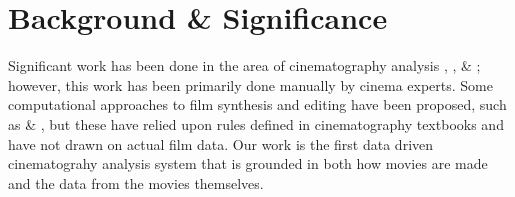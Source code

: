 
\section*{Background \& Significance}
Significant work has been done in the area of cinematography analysis \cite{bresson_notes_1997}, \cite{bordwell_film_2009}, \& \cite{arijon_grammar_1991}; however, this work has been primarily done manually by cinema experts. Some computational approaches to film synthesis and editing have been proposed, such as \cite{he_virtual_1996} \& \cite{lino_how_2014}, but these have relied upon rules defined in cinematography textbooks and have not drawn on actual film data. Our work is the first data driven cinematograhy analysis system that is grounded in both how movies are made and the data from the movies themselves. 